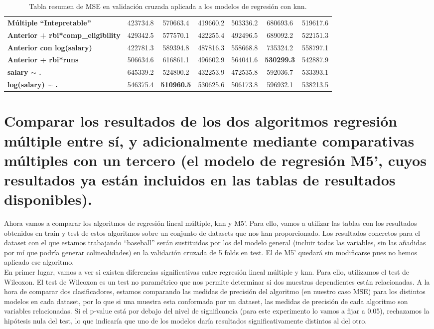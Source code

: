 \documentclass[a4paper,12pt, oneside]{book}
\begin{document}
\begin{table}[H]
\begin{tabular}{@{}lcccccc@{}}
\textbf{Múltiple ``Intepretable''} & 423734.8 & 570663.4 & 419660.2 & 503336.2 & 680693.6 & 519617.6\\
\textbf{Anterior + rbi*comp\_eligibility} & 429342.5 & 577570.1 & 422255.4 & 492496.5 & 689092.2 & 522151.3 \\
\textbf{Anterior con log(salary)} & 422781.3 & 589394.8 & 487816.3 & 558668.8 & 735324.2 & 558797.1 \\
\textbf{Anterior + rbi*runs} & 506634.6 & 616861.1 & 496602.9 & 564041.6 & \textbf{530299.3} & 542887.9 \\
\textbf{salary $\sim$ .} & 645339.2 & 524800.2 & 432253.9 & 472535.8 & 592036.7 & 533393.1 \\
\textbf{log(salary) $\sim$ .} & 546375.4 & \textbf{510960.5} & 530625.6 & 506173.8 & 596932.1 & 538213.5 \\ \bottomrule
\end{tabular}
\caption{Tabla resumen de MSE en validación cruzada aplicada a los modelos de regresión con knn.}
\label{tab:mseknnreg}
\end{table}

\newpage
\section[Comparativa de algoritmos]{Comparar los resultados de los dos algoritmos regresión múltiple entre sí, y adicionalmente mediante comparativas múltiples con un tercero (el modelo de regresión M5', cuyos resultados ya están incluidos en las tablas de resultados disponibles).}
Ahora vamos a comparar los algoritmos de regresión lineal múltiple, knn y M5'. Para ello, vamos a utilizar las tablas con los resultados obtenidos en train y test de estos algoritmos sobre un conjunto de datasets que nos han proporcionado. Los resultados concretos para el dataset con el que estamos trabajando ``baseball'' serán sustituidos por los del modelo general (incluir todas las variables, sin las añadidas por mí que podría generar colinealidades) en la validación cruzada de 5 folds en test. El de M5' quedará sin modificarse pues no hemos aplicado ese algoritmo. \\

En primer lugar, vamos a ver si existen diferencias significativas entre regresión lineal múltiple y knn. Para ello, utilizamos el test de Wilcoxon. El test de Wilcoxon es un test no paramétrico que nos permite determinar si dos muestras dependientes están relacionadas. A la hora de comparar dos clasificadores, estamos comparando las medidas de precisión del algoritmo (en nuestro caso MSE) para los distintos modelos en cada dataset, por lo que si una muestra esta conformada por un dataset, las medidas de precisión de cada algoritmo son variables relacionadas. Si el p-value está por debajo del nivel de significancia (para este experimento lo vamos a fijar a 0.05), rechazamos la hipótesis nula del test, lo que indicaría que uno de los modelos daría resultados significativamente distintos al del otro.
\end{document}

